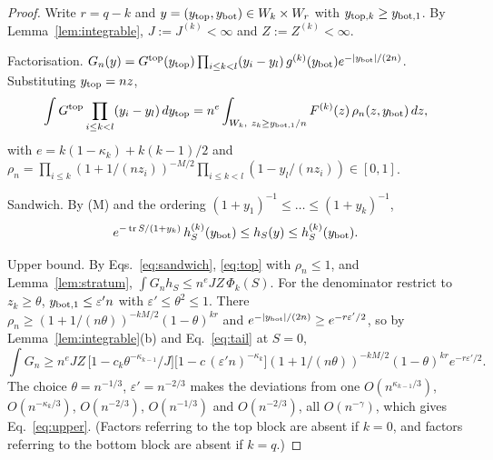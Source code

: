 \documentclass[11pt]{article}
\newcommand{\tr}{\operatorname{tr}}
\theoremstyle{remark}
\begin{document}
\begin{proof}
Write $r=q-k$ and $y=(y_{\rm top},y_{\rm bot})\in W_k\times W_r$ with $y_{{\rm top},k}\ge y_{{\rm bot},1}$.
By Lemma~\ref{lem:integrable}, $J:=J^{(k)}<\infty$ and $Z:=Z^{(k)}<\infty$.

Factorisation.
$G_n(y)=G^{\rm top}(y_{\rm top})\prod_{i\le k<l}(y_i-y_l)\,g^{(k)}(y_{\rm bot})e^{-\lvert y_{\rm bot}\rvert/(2n)}$.
Substituting $y_{\rm top}=nz$,
\begin{equation}
  \int G^{\rm top}\prod_{i\le k<l}(y_i-y_l)\,dy_{\rm top}=n^{e}\int_{W_k,\ z_k\ge y_{{\rm bot},1}/n}F^{(k)}(z)\,\rho_n(z,y_{\rm bot})\,dz,
  \label{eq:top}
\end{equation}
with $e=k(1-\kappa_k)+k(k-1)/2$ and $\rho_n=\prod_{i\le k}(1+1/(nz_i))^{-M/2}\prod_{i\le k<l}(1-y_l/(nz_i))\in[0,1]$.

Sandwich.
By (M) and the ordering $(1+y_1)^{-1}\le\dots\le(1+y_k)^{-1}$,
\begin{equation}
  e^{-\tr S/(1+y_k)}\,h^{(k)}_S(y_{\rm bot})\le h_S(y)\le h^{(k)}_S(y_{\rm bot}).
  \label{eq:sandwich}
\end{equation}

Upper bound.
By Eqs.~\eqref{eq:sandwich}, \eqref{eq:top} with $\rho_n\le1$, and Lemma~\ref{lem:stratum}, $\int G_nh_S\le n^eJZ\,\Phi_k(S)$.
For the denominator restrict to $z_k\ge\theta$, $y_{{\rm bot},1}\le\varepsilon'n$ with $\varepsilon'\le\theta^2\le1$.
There $\rho_n\ge(1+1/(n\theta))^{-kM/2}(1-\theta)^{kr}$ and $e^{-\lvert y_{\rm bot}\rvert/(2n)}\ge e^{-r\varepsilon'/2}$, so by Lemma~\ref{lem:integrable}(b) and Eq.~\eqref{eq:tail} at $S=0$,
\begin{equation}
  \int G_n\ge n^eJZ\,\big[1-c_k\theta^{-\kappa_{k-1}}/J\big]\big[1-c\,(\varepsilon'n)^{-\kappa_k}\big](1+1/(n\theta))^{-kM/2}(1-\theta)^{kr}e^{-r\varepsilon'/2}.
  \label{eq:den}
\end{equation}
The choice $\theta=n^{-1/3}$, $\varepsilon'=n^{-2/3}$ makes the deviations from one $O(n^{\kappa_{k-1}/3})$, $O(n^{-\kappa_k/3})$, $O(n^{-2/3})$, $O(n^{-1/3})$ and $O(n^{-2/3})$, all $O(n^{-\gamma})$, which gives Eq.~\eqref{eq:upper}.
(Factors referring to the top block are absent if $k=0$, and factors referring to the bottom block are absent if $k=q$.)


\end{proof}
\end{document}
